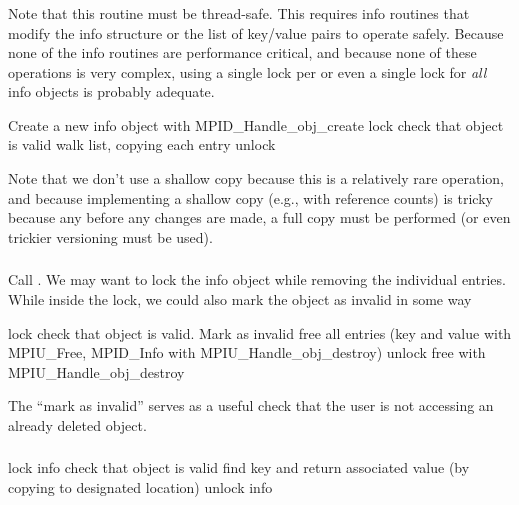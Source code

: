 \documentclass{article}
\begin{document}
\subsubsection{}
Note that this routine must be thread-safe.  This requires info routines that
modify the info structure or the list of key/value pairs to operate safely.
Because none of the info routines are performance critical, and because none
of these operations is very complex, using a single lock per 
or even a single lock for \emph{all} info objects is probably adequate.
\begin{algorithm}
Create a new info object with MPID_Handle_obj_create
lock
check that object is valid
walk list, copying each entry
unlock
\end{algorithm}
Note that we don't use a shallow copy because this is a relatively
rare operation, and because implementing a shallow copy (e.g., with
reference counts) is tricky because any before any changes are made,
a full copy must be performed (or even trickier versioning must be
used).

\subsubsection{}
Call .  We may want to lock the info object
while removing the individual entries.  While inside the lock, we
could also mark the object as invalid in some way

\begin{algorithm}
lock
check that object is valid.  Mark as invalid
free all entries (key and value with MPIU_Free, MPID_Info with 
    MPIU_Handle_obj_destroy)
unlock
free with MPIU_Handle_obj_destroy
\end{algorithm}
The ``mark as invalid'' serves as a
useful check that the user is not accessing an already deleted
object.  

\subsubsection{}
\begin{algorithm}
lock info
check that object is valid
find key and return associated value (by copying to designated location)
unlock info
\end{algorithm}
\end{document}

